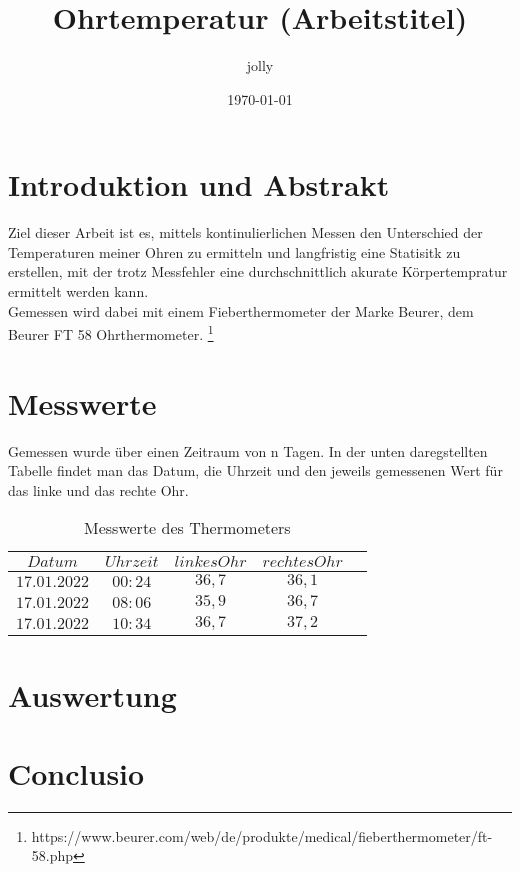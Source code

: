 \documentclass{article}
\title{Ohrtemperatur (Arbeitstitel)}
\author{jolly}
\date{\today}
\begin{document}
\maketitle
\newpage
\tableofcontents

\newpage
\section{Introduktion und Abstrakt}
Ziel dieser Arbeit ist es, mittels kontinulierlichen Messen den Unterschied der Temperaturen meiner Ohren zu  ermitteln und langfristig eine Statisitk zu erstellen, mit der trotz Messfehler eine durchschnittlich akurate Körpertempratur ermittelt werden kann. \\ Gemessen wird dabei mit einem Fieberthermometer der Marke Beurer, dem Beurer FT 58 Ohrthermometer. \footnote{https://www.beurer.com/web/de/produkte/medical/fieberthermometer/ft-58.php}

\newpage
\section{Messwerte}
Gemessen wurde über einen Zeitraum von n Tagen.
In der unten daregstellten Tabelle findet man das Datum, die Uhrzeit und den jeweils gemessenen Wert für das linke und das rechte Ohr.

\begin{table}[h!]
    \centering
    \begin{tabular}{c|c|c|c|c}
   $Datum $& $Uhrzeit $& $linkes Ohr $& $rechtes Ohr $ \\ \hline
    $17.01.2022$   & $00:24$ & $36,7$ &  $36,1$\\ \hline
    $17.01.2022$   & $08:06$ & $35,9$ &  $36,7$\\ \hline
    $17.01.2022$   & $10:34$ & $36,7$ &  $37,2$\\ \hline
    \end{tabular}
    \caption{Messwerte des Thermometers}
\end{table}

\newpage
\section{Auswertung}

\newpage
\section{Conclusio}
\end{document}
